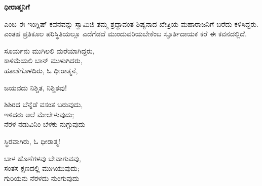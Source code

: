 \begin{myquote}
\end{myquote}

\begin{myquote}
\end{myquote}

\selectkan

\begin{center}
\textbf{ಧೀರಾತ್ಮನಿಗೆ}
\end{center}

 ಎಂಬ ಈ ಇಂಗ್ಲಿಷ್ ಕವನವನ್ನು ಸ್ವಾಮಿಜಿ ತಮ್ಮ ಶ್ರದ್ಧಾವಂತ ಶಿಷ್ಯನಾದ ಖೇತ್ರಿಯ ಮಹಾರಾಜನಿಗೆ ಬರೆದು ಕಳಿಸಿದ್ದರು. ಎಂತಹ ಪ್ರತಿಕೂಲ ಪರಿಸ್ಥಿತಿಯಲ್ಲೂ ಎದೆಗೆಡದೆ ಮುಂದುವರಿಯಬೇಕೆಂಬ ಸ್ಫೂರ್ತಿದಾಯಕ ಕರೆ ಈ ಕವನದಲ್ಲಿದೆ.

\begin{myquote}
ಸೂರ್ಯನು ಮುಗಿಲಲಿ ಮರೆಯಾಗಿದ್ದರು,\\ಕಾಳಿಮೆಯಲಿ ಬಾನ್ ಮುಳುಗಿದರು,\\ಹತಾಶೆಗೊಳದಿರು, ಓ ಧೀರಾತ್ಮನೆ,
\end{myquote}

\begin{flushright}
ಜಯವದು ನಿಶ್ಚಿತ, ನಿಶ್ಚಿತವು!
\end{flushright}

\begin{myquote}
ಶಿಶಿರದ ಬೆನ್ನೆಡೆ ವಸಂತ ಬರುವುದು,\\ಇಳಿದರು ಅಲೆ ಮೇಲೇಳುವುದು;\\ನೆರಳ ನಡುವಿನಿಂ ಬೆಳಕು ನುಗ್ಗುವುದು
\end{myquote}

\begin{flushright}
ಸ್ಥಿರವಾಗಿರು, ಓ ಧೀರಾತ್ಮ!
\end{flushright}

\begin{myquote}
ಬಾಳ ಹೊಣೆಗಳವು ಬೇವಾಗುವವು,\\ಸಂತಸ ಕ್ಷಣದಲ್ಲಿ ಮುಗಿಯುವುದು;\\ಗುರಿಯನು ನೆರಳದು ನುಂಗುವುದು
\end{myquote}

